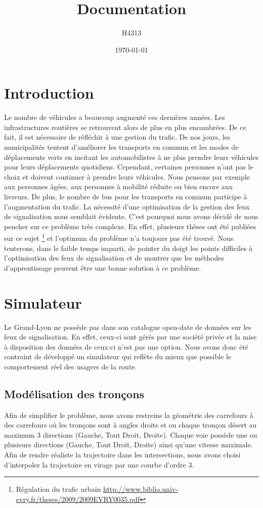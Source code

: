 \documentclass[11pt]{article}
\title{Documentation}
\author{H4313}
\date{\today}
\begin{document}
\maketitle
\tableofcontents
\newpage

\section{Introduction}
Le nombre de véhicules a beaucoup augmenté ces dernières années. Les infrastructures routières se retrouvent alors de plus en plus encombrées. De ce fait, il est nécessaire de réfléchir à une gestion du trafic. De nos jours, les municipalités tentent d'améliorer les transports en commun et les modes de déplacements verts en incitant les automobilistes à ne plus prendre leurs véhicules pour leurs déplacements quotidiens. Cependant, certaines personnes n'ont pas le choix et doivent continuer à prendre leurs véhicules. Nous pensons par exemple aux personnes âgées, aux personnes à mobilité réduite ou bien encore aux livreurs. De plus, le nombre de bus pour les transports en commun participe à l'augmentation du trafic. La nécessité d'une optimisation de la gestion des feux de signalisation nous semblait évidente. C'est pourquoi nous avons décidé de nous pencher sur ce problème très complexe. En effet, plusieurs thèses ont été publiées sur ce sujet \footnote{Régulation du trafic urbain \url{http://www.biblio.univ-evry.fr/theses/2009/2009EVRY0035.pdf}} et l'optimum du problème n'a toujours pas été trouvé. Nous tenterons, dans le faible temps imparti, de pointer du doigt les points difficiles à l'optimisation des feux de signalisation et de montrer que les méthodes d'apprentissage peuvent être une bonne solution à ce problème.

\section{Simulateur}
Le Grand-Lyon ne possède pas dans son catalogue open-date de données sur les feux de signalisation. En effet, ceux-ci sont gérés par une société privée et la mise à disposition des données de ceux-ci n'est pas une option. Nous avons donc été contraint de développé un simulateur qui reflète du mieux que possible le comportement réel des usagers de la route.

\subsection{Modélisation des tronçons}
Afin de simplifier le problème, nous avons restreins la géométrie des carrefours à des carrefours où les tronçons sont à angles droits et ou chaque tronçon désert au maximum 3 directions (Gauche, Tout Droit, Droite). Chaque voie possède une ou plusieurs directions (Gauche, Tout Droit, Droite) ainsi qu'une vitesse maximale. 
Afin de rendre réaliste la trajectoire dans les intersections, nous avons choisi d'interpoler la trajectoire en virage par une courbe d'ordre 3. 
\end{document}
